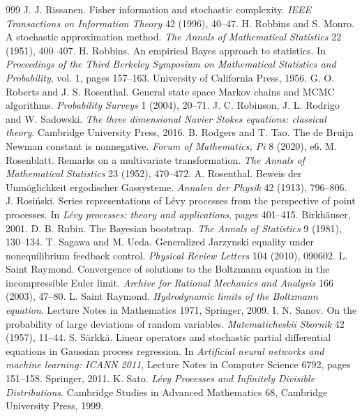 \begin{thebibliography}{999}
 J. J. Rissanen. Fisher information and stochastic complexity. \emph{IEEE Transactions on Information Theory} 42 (1996), 40--47.
 H. Robbins and S. Monro. A stochastic approximation method. \emph{The Annals of Mathematical Statistics} 22 (1951), 400--407.
 H. Robbins. An empirical Bayes approach to statistics. In \emph{Proceedings of the Third Berkeley Symposium on Mathematical Statistics and Probability}, vol. 1, pages 157--163. University of California Press, 1956.
 G. O. Roberts and J. S. Rosenthal. General state space Markov chains and MCMC algorithms. \emph{Probability Surveys} 1 (2004), 20--71.
 J. C. Robinson, J. L. Rodrigo and W. Sadowski. \emph{The three dimensional Navier Stokes equations: classical theory}. Cambridge University Press, 2016.
 B. Rodgers and T. Tao. The de Bruijn Newman constant is nonnegative. \emph{Forum of Mathematics, Pi} 8 (2020), e6.
 M. Rosenblatt. Remarks on a multivariate transformation. \emph{The Annals of Mathematical Statistics} 23 (1952), 470--472.
 A. Rosenthal. Beweis der Unm\"oglichkeit ergodischer Gassysteme. \emph{Annalen der Physik} 42 (1913), 796--806.
 J. Rosi\'nski. Series representations of L\'evy processes from the perspective of point processes. In \emph{L\'evy processes: theory and applications}, pages 401--415. Birkh\"auser, 2001.
 D. B. Rubin. The Bayesian bootstrap. \emph{The Annals of Statistics} 9 (1981), 130--134.
 T. Sagawa and M. Ueda. Generalized Jarzynski equality under nonequilibrium feedback control. \emph{Physical Review Letters} 104 (2010), 090602.
 L. Saint Raymond. Convergence of solutions to the Boltzmann equation in the incompressible Euler limit. \emph{Archive for Rational Mechanics and Analysis} 166 (2003), 47--80.
 L. Saint Raymond. \emph{Hydrodynamic limits of the Boltzmann equation}. Lecture Notes in Mathematics 1971, Springer, 2009.
 I. N. Sanov. On the probability of large deviations of random variables. \emph{Matematicheskii Sbornik} 42 (1957), 11--44.
 S. S\"arkk\"a. Linear operators and stochastic partial differential equations in Gaussian process regression. In \emph{Artificial neural networks and machine learning: ICANN 2011}, Lecture Notes in Computer Science 6792, pages 151--158. Springer, 2011.
 K. Sato. \emph{L\'evy Processes and Infinitely Divisible Distributions}. Cambridge Studies in Advanced Mathematics 68, Cambridge University Press, 1999.

\end{thebibliography}
